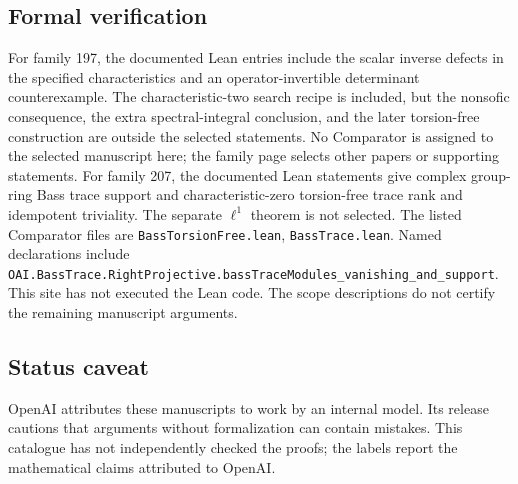 \documentclass[11pt]{article}
\begin{document}
\subsection{Formal verification}
For family 197, the documented Lean entries include the scalar inverse defects in the specified characteristics and an operator-invertible determinant counterexample. The characteristic-two search recipe is included, but the nonsofic consequence, the extra spectral-integral conclusion, and the later torsion-free construction are outside the selected statements. No Comparator is assigned to the selected manuscript here; the family page selects other papers or supporting statements. For family 207, the documented Lean statements give complex group-ring Bass trace support and characteristic-zero torsion-free trace rank and idempotent triviality. The separate $\ell^1$ theorem is not selected. The listed Comparator files are \texttt{BassTorsionFree.lean}, \texttt{BassTrace.lean}. Named declarations include \texttt{OAI.BassTrace.RightProjective.bassTraceModules\_vanishing\_and\_support}. This site has not executed the Lean code. The scope descriptions do not certify the remaining manuscript arguments.

\subsection{Status caveat}
OpenAI attributes these manuscripts to work by an internal model. Its release cautions that arguments without formalization can contain mistakes. This catalogue has not independently checked the proofs; the labels report the mathematical claims attributed to OpenAI.
\end{document}

